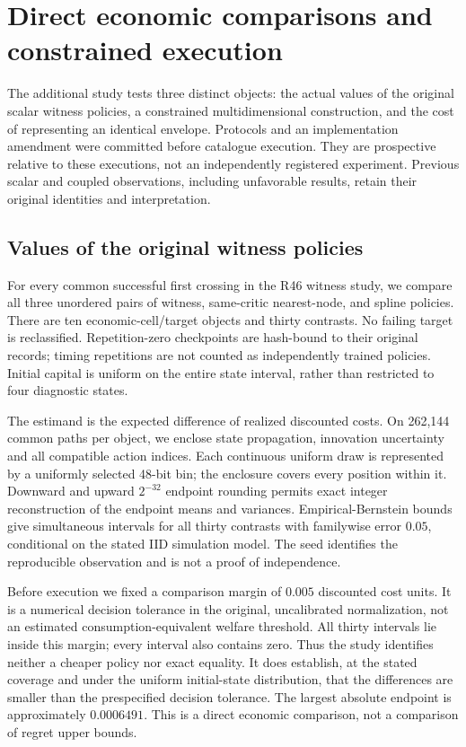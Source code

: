 \section{Direct economic comparisons and constrained execution}\label{sec:evidence47}
The additional study tests three distinct objects: the actual values of the original scalar witness policies, a constrained multidimensional construction, and the cost of representing an identical envelope. Protocols and an implementation amendment were committed before catalogue execution. They are prospective relative to these executions, not an independently registered experiment. Previous scalar and coupled observations, including unfavorable results, retain their original identities and interpretation.

\subsection{Values of the original witness policies}
For every common successful first crossing in the R46 witness study, we compare all three unordered pairs of witness, same-critic nearest-node, and spline policies. There are ten economic-cell/target objects and thirty contrasts. No failing target is reclassified. Repetition-zero checkpoints are hash-bound to their original records; timing repetitions are not counted as independently trained policies. Initial capital is uniform on the entire state interval, rather than restricted to four diagnostic states.

The estimand is the expected difference of realized discounted costs. On 262,144 common paths per object, we enclose state propagation, innovation uncertainty and all compatible action indices. Each continuous uniform draw is represented by a uniformly selected 48-bit bin; the enclosure covers every position within it. Downward and upward $2^{-32}$ endpoint rounding permits exact integer reconstruction of the endpoint means and variances. Empirical-Bernstein bounds \citep{maurer2009} give simultaneous intervals for all thirty contrasts with familywise error $0.05$, conditional on the stated IID simulation model. The seed identifies the reproducible observation and is not a proof of independence.

Before execution we fixed a comparison margin of $0.005$ discounted cost units. It is a numerical decision tolerance in the original, uncalibrated normalization, not an estimated consumption-equivalent welfare threshold. All thirty intervals lie inside this margin; every interval also contains zero. Thus the study identifies neither a cheaper policy nor exact equality. It does establish, at the stated coverage and under the uniform initial-state distribution, that the differences are smaller than the prespecified decision tolerance. The largest absolute endpoint is approximately $0.0006491$. This is a direct economic comparison, not a comparison of regret upper bounds.


